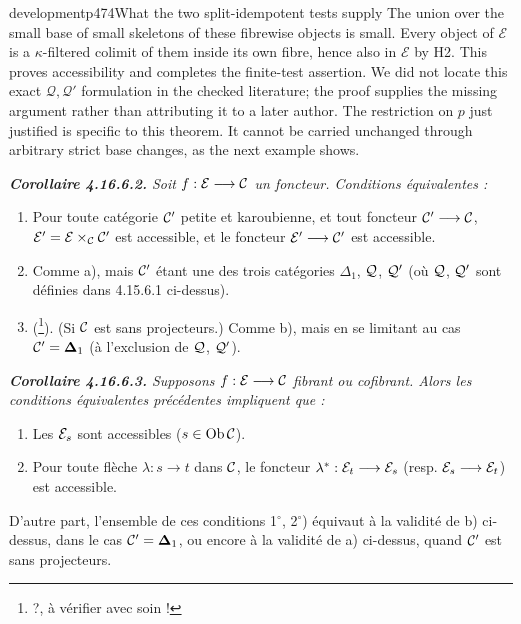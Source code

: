 \begin{dcomment}{development}{p474}{What the two split-idempotent tests supply}
The union over the small base of small skeletons of these fibrewise objects is small. Every object of $\mathcal E$ is a $\kappa$-filtered colimit of them inside its own fibre, hence also in $\mathcal E$ by H2. This proves accessibility and completes the finite-test assertion. We did not locate this exact $\mathcal Q,\mathcal Q'$ formulation in the checked literature; the proof supplies the missing argument rather than attributing it to a later author. The restriction on $p$ just justified is specific to this theorem. It cannot be carried unchanged through arbitrary strict base changes, as the next example shows.
\end{dcomment}


\begingroup\itshape
\noindent\textbf{\upshape Corollaire 4.16.6.2.} Soit $f : \mathcal{E} \longrightarrow \mathcal{C}$ un foncteur. Conditions équivalentes :
\begin{enumerate}[label={}]
\item[a)] Pour toute catégorie $\mathcal{C}'$ \textup{petite} et \textup{karoubienne}, et tout foncteur $\mathcal{C}' \longrightarrow \mathcal{C}$, $\mathcal{E}' = \mathcal{E} \times_{\mathcal{C}} \mathcal{C}'$ est accessible, et le foncteur $\mathcal{E}' \longrightarrow \mathcal{C}'$ est accessible.
\item[b)] Comme a), mais $\mathcal{C}'$ étant une des trois catégories $\Delta_1$, $\mathcal{Q}$, $\mathcal{Q}'$ (où $\mathcal{Q}$, $\mathcal{Q}'$ sont définies dans 4.15.6.1 ci-dessus).
\item[b$'$)] \textup{(}\footnote{?, à vérifier avec soin !}\textup{)}. (Si $\mathcal{C}$ est sans projecteurs.) Comme b), mais en se limitant au cas $\mathcal{C}' = \boldsymbol{\Delta}_1$ (à l'exclusion de $\mathcal{Q}$, $\mathcal{Q}'$).
\end{enumerate}
\endgroup

\begingroup\itshape
\noindent\textbf{\upshape Corollaire 4.16.6.3.} Supposons $f : \mathcal{E} \longrightarrow \mathcal{C}$ fibrant ou cofibrant. Alors les conditions équivalentes précédentes impliquent que :
\begin{enumerate}[label={}]
\item[1$^\circ$)] Les $\mathcal{E}_s$ sont accessibles ($s \in \operatorname{Ob} \mathcal{C}$).
\item[2$^\circ$)] Pour toute flèche $\lambda : s \longrightarrow t$ dans $\mathcal{C}$, le foncteur $\lambda^* : \mathcal{E}_t \longrightarrow \mathcal{E}_s$ (resp. $\mathcal{E}_s \longrightarrow \mathcal{E}_t$) est accessible.
\end{enumerate}
\noindent D'autre part, l'ensemble de ces conditions 1$^\circ$, 2$^\circ$) équivaut à la validité de b) ci-dessus, dans le cas $\mathcal{C}' = \boldsymbol{\Delta}_1$, ou encore à la validité
de a) ci-dessus, quand $\mathcal{C}'$ est \textup{sans projecteurs}.
\endgroup


